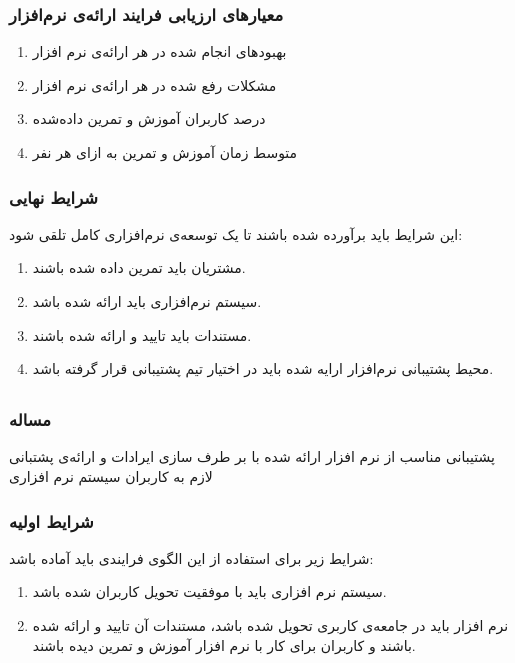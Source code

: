 \subsubsection{معیار‌های ارزیابی فرایند ارائه‌ی نرم‌افزار}
\begin{enumerate}
\item بهبود‌های انجام شده در هر ارائه‌ی نرم افزار
\item مشکلات رفع شده در هر ارائه‌ی نرم افزار
\item درصد کاربران آموزش و تمرین داده‌شده
\item متوسط زمان آموزش و تمرین به ازای هر نفر
\end{enumerate}

\subsubsection{شرایط نهایی}
این شرایط باید برآورده شده باشند تا یک توسعه‌ی نرم‌افزاری کامل تلقی شود:
\begin{enumerate}
\item مشتریان باید تمرین داده شده باشند.
\item سیستم نرم‌افزاری باید ارائه شده باشد.
\item مستندات باید تایید و ارائه شده باشند.
\item محیط پشتیبانی نرم‌افزار ارايه شده باید در اختیار تیم پشتیبانی قرار گرفته باشد.
\end{enumerate}
\cite{more-process-patterns}
\subsection{}
\subsubsection{مساله}
پشتیبانی مناسب از نرم افزار ارائه شده با بر طرف سازی ایرادات و ارائه‌ی پشتبانی لازم به کاربران سیستم نرم افزاری
\subsubsection{شرایط اولیه}
شرایط زیر برای استفاده از این الگوی فرایندی باید آماده باشد:
\begin{enumerate}
\item 
سیستم نرم افزاری باید با موفقیت تحویل کاربران شده باشد.
\item
نرم افزار باید در جامعه‌ی کاربری تحویل شده باشد، مستندات آن تایید و ارائه شده باشند و کاربران برای کار با نرم افزار آموزش و تمرین دیده باشند.
\end{enumerate}

